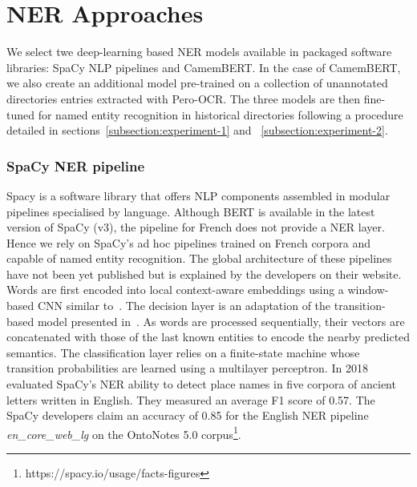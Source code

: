 \section{NER Approaches}
We select twe deep-learning based NER models available in packaged software libraries: SpaCy NLP pipelines and CamemBERT.
In the case of CamemBERT, we also create an additional model pre-trained on a collection of unannotated directories entries extracted with Pero-OCR.
The three models are then fine-tuned for named entity recognition in historical directories following a procedure detailed in sections~\ref{subsection:experiment-1} and ~\ref{subsection:experiment-2}.

\subsubsection{SpaCy NER pipeline}
Spacy is a software library that offers NLP components assembled in modular pipelines specialised by language.
Although BERT is available in the latest version of SpaCy (v3), the pipeline for French does not provide a NER layer.
Hence we rely on SpaCy's ad hoc pipelines trained on French corpora and capable of named entity recognition.
The global architecture of these pipelines have not been yet published but is explained by the developers on their website.
Words are first encoded into local context-aware embeddings using a window-based CNN similar to~\cite{collobert2011}.
The decision layer is an adaptation of the transition-based model presented in~\cite{lample2016}.
As words are processed sequentially, their vectors are concatenated with those of the last known entities to encode the nearby predicted semantics.
The classification layer relies on a finite-state machine whose transition probabilities are learned using a multilayer perceptron.
In 2018~\cite{won2018} evaluated SpaCy's NER ability to detect place names in five corpora of ancient letters written in English.
They measured an average F1 score of 0.57.
The SpaCy developers claim an accuracy of 0.85 for the English NER pipeline \textit{en\_core\_web\_lg} on the OntoNotes 5.0 corpus\footnote{https://spacy.io/usage/facts-figures}.

